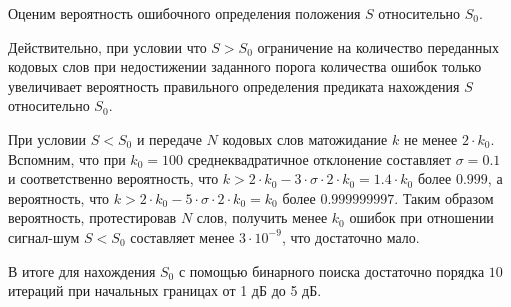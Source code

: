Оценим вероятность ошибочного определения положения $S$ относительно $S_0$.

Действительно, при условии что $S > S_0$ ограничение на количество переданных кодовых слов
при недостижении заданного порога количества ошибок только увеличивает вероятность правильного определения
предиката нахождения $S$ относительно $S_0$. 

При условии $S < S_0$ и передаче $N$ кодовых слов 
матожидание $k$ не менее $2 \cdot k_0$. Вспомним, что при $k_0=100$ среднеквадратичное отклонение 
составляет $\sigma=0.1$ 
и соответственно вероятность, что $k > 2 \cdot k_0 - 3 \cdot \sigma \cdot 2 \cdot k_0 = 1.4 \cdot k_0$
 более $0.999$, а вероятность, что $k > 2 \cdot k_0 - 5 \cdot \sigma \cdot 2 \cdot k_0 = k_0$ более $0.999999997$.
Таким образом вероятность, протестировав $N$ слов, получить менее $k_0$ ошибок при отношении сигнал-шум
$S < S_0$ составляет менее $3 \cdot 10^{-9}$, что достаточно мало.

В итоге для нахождения $S_0$ с помощью бинарного поиска достаточно порядка $10$ итераций при начальных
границах от 1 дБ до 5 дБ.




















































































